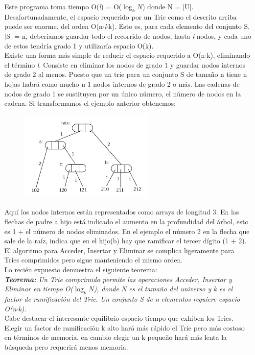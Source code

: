 \documentclass[es]{ifirak}
\begin{document}
{Este programa toma tiempo O(\textit{l}) = O($\log_{k}N$) donde N = $|$U$|$. Desafortunadamente, el espacio requerido por un Trie como el descrito arriba puede ser enorme, del orden O(n$\cdot$\textit{l}$\cdot$k). Esto es, para cada elemento del conjunto S, $|$S$|$ = n, deberíamos guardar todo el recorrido de nodos, hasta \textit{l} nodos, y cada uno de estos tendría grado 1 y utilizaría espacio O(k). \\

Existe una forma más simple de reducir el espacio requerido a O(n$\cdot$k), eliminando el término \textit{l}. Consiste en eliminar los nodos de grado 1 y guardar nodos internos de grado 2 al menos. Puesto que un trie para un conjunto S de tamaño n tiene n hojas habrá como mucho n-1 nodos internos de grado 2 o más. Las cadenas de nodos de grado 1 se sustituyen por un único número, el número de nodos en la cadena. Si transformamos el ejemplo anterior obtenemos: \\

\begin{figure}[hbtp]
	\centering
	\includegraphics[width=0.6\textwidth]{trie3.png}
\end{figure}

Aquí los nodos internos están representados como arrays de longitud 3. En las flechas de padre a hijo está indicado el aumento en la profundidad del árbol, esto es 1 + el número de nodos eliminados. En el ejemplo el número 2 en la flecha que sale de la raíz, indica que en el hijo(b) hay que ramificar el tercer dígito (1 + 2). El algoritmo para Acceder, Insertar y Eliminar se complica ligeramente para Tries comprimidos pero sigue manteniendo el mismo orden.\\

Lo recién expuesto demuestra el siguiente teorema:\\

\textit{\textbf{Teorema:} Un Trie comprimido permite las operaciones Acceder, Insertar y Eliminar en tiempo O($\log_{k}N$), donde N es el tamaño del universo y k es el factor de ramificación del Trie. Un conjunto S de n elementos requiere espacio O(n$\cdot$k).}\\

Cabe destacar el interesante equilibrio espacio-tiempo que exhiben los Tries. Elegir un factor de ramificación k alto hará más rápido el Trie pero más costoso en términos de memoria, en cambio elegir un k pequeño hará más lenta la búsqueda pero requerirá menos memoria.
}
\pagebreak
\end{document}
